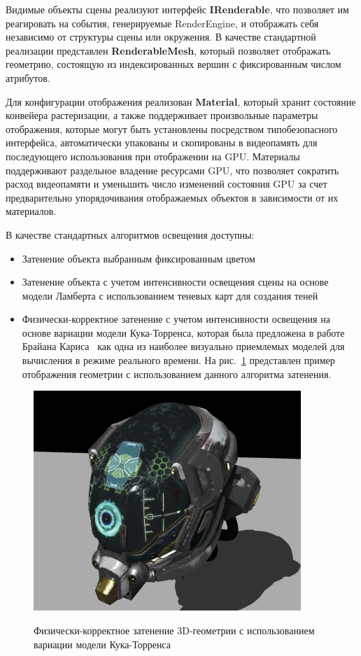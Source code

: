 \documentclass[14pt]{matmex-diploma}
\begin{document}
Видимые объекты сцены реализуют интерфейс \textbf{IRenderable}, что позволяет им реагировать на события, генерируемые RenderEngine, и отображать себя независимо от структуры сцены или окружения. В качестве стандартной реализации представлен \textbf{RenderableMesh}, который позволяет отображать геометрию, состоящую из индексированных вершин с фиксированным числом атрибутов.

Для конфигурации отображения реализован \textbf{Material}, который хранит состояние конвейера растеризации, а также поддерживает произвольные параметры отображения, которые могут быть установлены посредством типобезопасного интерфейса, автоматически упакованы и скопированы в видеопамять для последующего использования при отображении на GPU. Материалы поддерживают раздельное владение ресурсами GPU, что позволяет сократить расход видеопамяти и уменьшить число изменений состояния GPU за счет предварительно упорядочивания отображаемых объектов в зависимости от их материалов.  

В качестве стандартных алгоритмов освещения доступны:

\begin{itemize}
    \item Затенение объекта выбранным фиксированным цветом
    \item Затенение объекта с учетом интенсивности освещения сцены на основе модели Ламберта с использованием теневых карт для создания теней
    \item Физически-корректное затенение с учетом интенсивности освещения на основе вариации модели Кука-Торренса, которая была предложена в работе Брайана Кариса~\cite{pbr:unreal:engine} как одна из наиболее визуально приемлемых моделей для вычисления в режиме реального времени. На рис.~\ref{fig:helmet:pbr} представлен пример отображения геометрии с использованием данного алгоритма затенения.
\end{itemize}

\begin{figure}[]
     \caption{Физически-корректное затенение 3D-геометрии с использованием вариации модели
     Кука-Торренса}
     \centering
     \includegraphics[width=0.9\textwidth]{pictures/Helmet}
     \label{fig:helmet:pbr}
\end{figure}
\end{document}

